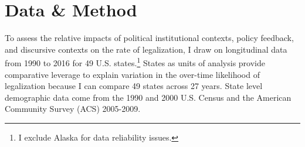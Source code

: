 
\section{Data \& Method}

To assess the relative impacts of political institutional contexts, policy feedback, and discursive contexts on the rate of legalization, I draw on longitudinal data from 1990 to 2016 for 49 U.S. states.\footnote{I exclude Alaska for data reliability issues.} %
States as units of analysis provide comparative leverage to explain variation in the over-time likelihood of legalization because I can compare 49 states across 27 years. %
State level demographic data come from the 1990 and 2000 U.S. Census and the American Community Survey (ACS) 2005-2009. %

